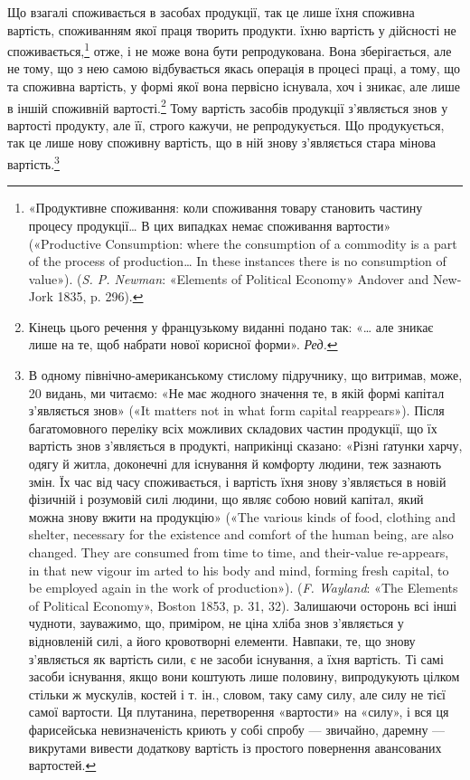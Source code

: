 Що взагалі споживається в засобах продукції, так це лише
їхня споживна вартість, споживанням якої праця творить продукти.
їхню вартість у дійсності не споживається,\footnote{
«Продуктивне споживання: коли споживання товару становить
частину процесу продукції\dots{} В цих випадках немає споживання вартости»
(«Productive Consumption: where the consumption of a commodity is a
part of the process of production\dots{} In these instances there is no consumption
of value»). (\emph{S. P. Newman}: «Elements of Political Economy» Andover
and New-Jork 1835, p. 296).
} отже, і
не може вона бути репродукована. Вона зберігається, але не
тому, що з нею самою відбувається якась операція в процесі
праці, а тому, що та споживна вартість, у формі якої вона первісно
існувала, хоч і зникає, але лише в іншій споживній вартості.\footnote*{
Кінець цього речення у французькому виданні подано так: «\dots{} але
зникає лише на те, щоб набрати нової корисної форми». \emph{Ред.}
}
Тому вартість засобів продукції з’являється знов у вартості
продукту, але її, строго кажучи, не репродукується. Що продукується,
так це лише нову споживну вартість, що в ній знову
з’являється стара мінова вартість.\footnote{
В одному північно-американському стислому підручнику, що витримав,
може, 20 видань, ми читаємо: «Не має жодного значення те, в
якій формі капітал з’являється знов» («It matters not in what form capital
reappears»). Після багатомовного переліку всіх можливих складових
частин продукції, що їх вартість знов з’являється в продукті, наприкінці
сказано: «Різні ґатунки харчу, одягу й житла, доконечні для існування
й комфорту людини, теж зазнають змін. Їх час від часу споживається, і
вартість їхня знову з’являється в новій фізичній і розумовій силі людини, що
являє собою новий капітал, який можна знову вжити на продукцію» («The
various kinds of food, clothing and shelter, necessary for the existence and
comfort of the human being, are also changed. They are consumed from time
to time, and their-value re-appears, in that new vigour im arted to his
body and mind, forming fresh capital, to be employed again in the work
of production»). (\emph{F. Wayland}: «The Elements of Political Economy»,
Boston 1853, p. 31, 32). Залишаючи осторонь всі інші чудноти, зауважимо,
що, приміром, не ціна хліба знов з’являється у відновленій силі,
а його кровотворні елементи. Навпаки, те, що знову з’являється як вартість
сили, є не засоби існування, а їхня вартість. Ті самі засоби існування,
якщо вони коштують лише половину, випродукують цілком стільки ж
мускулів, костей і т. ін., словом, таку саму силу, але силу не тієї самої
вартости. Ця плутанина, перетворення «вартости» на «силу», і вся ця
фарисейська невизначеність криють у собі спробу — звичайно, даремну —
викрутами вивести додаткову вартість із простого повернення авансованих
вартостей.
}

